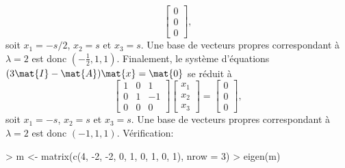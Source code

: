 \begin{exercice}
\begin{sol}
\begin{enumerate}
\begin{displaymath}
        \begin{bmatrix} 0 \\ 0 \\ 0 \end{bmatrix},
      \end{displaymath}
      soit $x_1 = -s/2$, $x_2 = s$ et $x_3 = s$. Une base de vecteurs
      propres correspondant à $\lambda = 2$ est donc $(-\frac{1}{2},
      1, 1)$.  Finalement, le système d'équations $(3\mat{I} -
      \mat{A}) \mat{x} = \mat{0}$ se réduit à
      \begin{displaymath}
        \begin{bmatrix}
          1 &  0 &  1 \\
          0 &  1 & -1 \\
          0 &  0 &  0
        \end{bmatrix}
        \begin{bmatrix} x_1 \\ x_2 \\ x_3 \end{bmatrix} =
        \begin{bmatrix} 0 \\ 0 \\ 0 \end{bmatrix},
      \end{displaymath}
      soit $x_1 = -s$, $x_2 = s$ et $x_3 = s$. Une base de vecteurs
      propres correspondant à $\lambda = 2$ est donc $(-1, 1, 1)$.
      Vérification:
\begin{Schunk}
\begin{Sinput}
> m <- matrix(c(4, -2, -2, 0, 1, 0, 1, 0, 1), nrow = 3)
> eigen(m)
\end{Sinput}
\end{Schunk}
\end{enumerate}
\end{sol}
\end{exercice}
